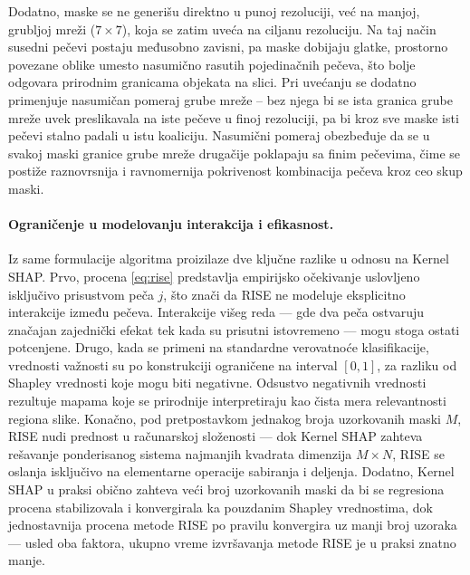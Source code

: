 Dodatno, maske se ne generišu direktno u punoj rezoluciji, već na manjoj, grubljoj mreži ($7 \times 7$), koja se zatim uveća na ciljanu rezoluciju. Na taj način susedni pečevi postaju međusobno zavisni, pa maske dobijaju glatke, prostorno povezane oblike umesto nasumično rasutih pojedinačnih pečeva, što bolje odgovara prirodnim granicama objekata na slici. Pri uvećanju se dodatno primenjuje nasumičan pomeraj grube mreže -- bez njega bi se ista granica grube mreže uvek preslikavala na iste pečeve u finoj rezoluciji, pa bi kroz sve maske isti pečevi stalno padali u istu koaliciju. Nasumični pomeraj obezbeđuje da se u svakoj maski granice grube mreže drugačije poklapaju sa finim pečevima, čime se postiže raznovrsnija i ravnomernija pokrivenost kombinacija pečeva kroz ceo skup maski.


\paragraph{Ograničenje u modelovanju interakcija i efikasnost.} Iz same formulacije algoritma proizilaze dve ključne razlike u odnosu na 
Kernel SHAP. Prvo, procena \eqref{eq:rise} predstavlja empirijsko očekivanje 
uslovljeno isključivo prisustvom peča $j$, što znači da RISE ne modeluje 
eksplicitno interakcije između pečeva. Interakcije višeg reda — gde dva peča 
ostvaruju značajan zajednički efekat tek kada su prisutni istovremeno — mogu 
stoga ostati potcenjene. Drugo, kada se primeni na standardne verovatnoće klasifikacije, vrednosti važnosti su po konstrukciji ograničene na interval $[0, 1]$, za razliku od Shapley vrednosti koje mogu biti negativne. Odsustvo negativnih vrednosti rezultuje mapama koje se prirodnije interpretiraju kao čista mera relevantnosti regiona slike.
Konačno, pod pretpostavkom jednakog broja uzorkovanih maski $M$, RISE nudi 
prednost u računarskoj složenosti — dok Kernel SHAP zahteva rešavanje 
ponderisanog sistema najmanjih kvadrata dimenzija $M \times N$, RISE se oslanja isključivo na elementarne operacije sabiranja i deljenja. Dodatno, Kernel SHAP u praksi obično zahteva veći broj uzorkovanih maski da bi se regresiona procena stabilizovala i konvergirala ka pouzdanim Shapley vrednostima, dok jednostavnija procena metode RISE po pravilu konvergira uz manji broj uzoraka — usled oba faktora, ukupno vreme izvršavanja metode RISE je u praksi znatno manje.
